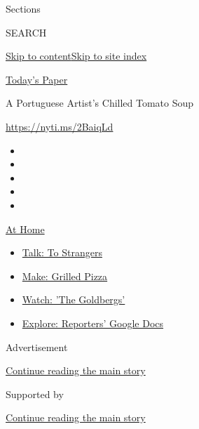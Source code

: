 Sections

SEARCH

\protect\hyperlink{site-content}{Skip to
content}\protect\hyperlink{site-index}{Skip to site index}

\href{https://myaccount.nytimes.com/auth/login?response_type=cookie\&client_id=vi}{}

\href{https://www.nytimes.com/section/todayspaper}{Today's Paper}

A Portuguese Artist's Chilled Tomato Soup

\url{https://nyti.ms/2BaiqLd}

\begin{itemize}
\item
\item
\item
\item
\item
\end{itemize}

\href{https://www.nytimes.com/spotlight/at-home?action=click\&pgtype=Article\&state=default\&region=TOP_BANNER\&context=at_home_menu}{At
Home}

\begin{itemize}
\tightlist
\item
  \href{https://www.nytimes.com/2020/08/03/well/family/the-benefits-of-talking-to-strangers.html?action=click\&pgtype=Article\&state=default\&region=TOP_BANNER\&context=at_home_menu}{Talk:
  To Strangers}
\item
  \href{https://www.nytimes.com/2020/08/01/at-home/coronavirus-make-pizza-on-a-grill.html?action=click\&pgtype=Article\&state=default\&region=TOP_BANNER\&context=at_home_menu}{Make:
  Grilled Pizza}
\item
  \href{https://www.nytimes.com/2020/07/31/arts/television/goldbergs-abc-stream.html?action=click\&pgtype=Article\&state=default\&region=TOP_BANNER\&context=at_home_menu}{Watch:
  'The Goldbergs'}
\item
  \href{https://www.nytimes.com/interactive/2020/at-home/even-more-reporters-editors-diaries-lists-recommendations.html?action=click\&pgtype=Article\&state=default\&region=TOP_BANNER\&context=at_home_menu}{Explore:
  Reporters' Google Docs}
\end{itemize}

Advertisement

\protect\hyperlink{after-top}{Continue reading the main story}

Supported by

\protect\hyperlink{after-sponsor}{Continue reading the main story}


